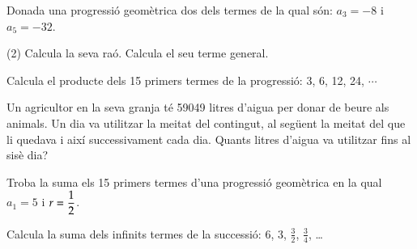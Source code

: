 \begin{mylist}
\exer[1]  Donada una progressió geomètrica dos dels termes de la qual són: $a_{3} = -8$ i $a_{5} = -32$. 
\begin{tasks}(2)
	\task   Calcula la seva raó.   \task Calcula el seu terme general.
\end{tasks}

\exer  Calcula el producte dels 15 primers termes de la progressió: 3, 6, 12, 24, $\cdots$


\exer  Un agricultor en la seva granja té 59049 litres d'aigua per donar de beure als animals. Un dia va utilitzar la meitat del contingut, al següent la meitat del que li quedava i així successivament cada dia. Quants litres d'aigua va utilitzar fins al sisè dia?

\exer[1]  Troba la suma els 15 primers termes d'una progressió geomètrica en la qual $a_{1} = 5$  i $r = \ofrac{1}{2}$.

\exer[1]  Calcula la suma dels infinits termes de la successió: 6, 3, $\frac{3}{2}$, $\frac{3}{4}$, {\dots}


\end{mylist}
